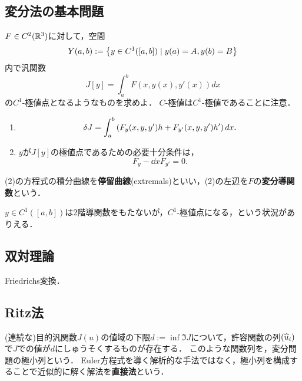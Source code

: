 \documentclass[uplatex,dvipdfmx]{jsreport}
\begin{document}
\subsection{変分法の基本問題}

\begin{problem}
    $F\in C^2(\mathbb{R}^3)$に対して，空間
    \[Y(a,b):=\left\{y\in C^1([a,b])\mid y(a)=A,y(b)=B\right\}\]
    内で汎関数
    \[J[y]=\int^b_aF(x,y(x),y'(x))dx\]
    の$C^1$-極値点となるようなものを求めよ．
    $C$-極値は$C^1$-極値であることに注意．
\end{problem}

\begin{proposition}[基本問題の変分とEuler方程式]\mbox{}
    \begin{enumerate}
        \item \[\delta J=\int^b_a\left(F_y(x,y,y')h+F_{y'}(x,y,y')h'\right)dx.\]
        \item $y$が$J[y]$の極値点であるための必要十分条件は，
        \[F_y-\dd{}{x}F_{y'}=0.\]
    \end{enumerate}
    (2)の方程式の積分曲線を\textbf{停留曲線}(extremals)といい，(2)の左辺を$F$の\textbf{変分導関数}という．
\end{proposition}

\begin{remark}
    $y\in C^1([a,b])$は2階導関数をもたないが，$C^1$-極値点になる，という状況がありえる．
\end{remark}

\subsection{双対理論}

\begin{tcolorbox}[colframe=ForestGreen, colback=ForestGreen!10!white,breakable,colbacktitle=ForestGreen!40!white,coltitle=black,fonttitle=\bfseries\sffamily,
title=]
    Friedrichs変換．
\end{tcolorbox}

\subsection{Ritz法}

\begin{definition}
    (連続な)目的汎関数$J(u)$の値域の下限$d:=\inf\Im J$について，許容関数の列$(\widehat{u}_i)$で$J$での値が$d$にしゅうそくするものが存在する．
    このような関数列を，変分問題の極小列という．
    Euler方程式を導く解析的な手法ではなく，極小列を構成することで近似的に解く解法を\textbf{直接法}という．
\end{definition}
\end{document}
